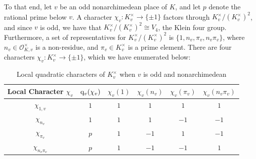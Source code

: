 \documentclass[10pt]{article}
\theoremstyle{plain}
\theoremstyle{definition}
\theoremstyle{remark}
\def\O{{\mathcal O}}
\newcommand{\q}{{\rm q}}
\begin{document}
To that end, let $v$ be an odd nonarchimedean place of $K$, and let
$p$ denote the rational prime below $v$. A character
$\chi_v:K_v^\times\to\{\pm 1\}$ factors through
$K_v^\times/(K_v^{\times})^2$, and since $v$ is odd, we have that
$K_v^\times/(K_v^{\times})^2 \cong V_4$, the Klein four
group. Furthermore, a set of representatives for
$K_v^\times/(K_v^{\times})^2$ is $\{1,n_v,\pi_v,n_v\pi_v\}$, where
$n_v\in\O_{K,v}^\times$ is a non-residue, and $\pi_v\in K_v^\times$ is
a prime element. There are four characters
$\chi_v:K_v^\times\to\{\pm1\}$, which we have enumerated below:
\begin{table}[h!!!!!!!]\begin{center} \begin{tabular}{|c||c||c|c|c|c|}
\hline
Local Character $\chi_v$  & $\q_v(\chi_v)$ & $\chi_v(1)$ & $\chi_v(n_v)$ & $\chi_v(\pi_v)$ & $\chi_v(n_v\pi_v)$
\\\hline \hline
$\chi_{1,v}$ & $1$ & $1$ & $1$ & $1$ & $1$
\\\hline
$\chi_{n_v}$ & $1$ & $1$ & $1$ & $-1$ & $-1$
\\\hline
$\chi_{\pi_v}$ & $p$ & $1$ & $-1$ & $1$ & $-1$
\\\hline $\chi_{n_v\pi_v}$ & $p$ & $1$ & $-1$ & $-1$ & $1$
\\\hline \end{tabular}
\caption{\small Local quadratic characters of $K_v^\times$ when $v$ is
  odd and nonarchimedean \label{ramchartable}}
\end{center}\vspace{-15pt}
\end{table}
\end{document}

